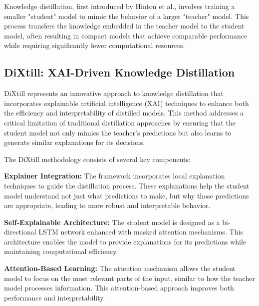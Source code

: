 Knowledge distillation, first introduced by Hinton et al., involves training a smaller "student" model to mimic the behavior of a larger "teacher" model. This process transfers the knowledge embedded in the teacher model to the student model, often resulting in compact models that achieve comparable performance while requiring significantly fewer computational resources.

\subsection{DiXtill: XAI-Driven Knowledge Distillation}

DiXtill represents an innovative approach to knowledge distillation that incorporates explainable artificial intelligence (XAI) techniques to enhance both the efficiency and interpretability of distilled models. This method addresses a critical limitation of traditional distillation approaches by ensuring that the student model not only mimics the teacher's predictions but also learns to generate similar explanations for its decisions.


The DiXtill methodology consists of several key components:

\textbf{Explainer Integration:} The framework incorporates local explanation techniques to guide the distillation process. These explanations help the student model understand not just what predictions to make, but why those predictions are appropriate, leading to more robust and interpretable behavior.

\textbf{Self-Explainable Architecture:} The student model is designed as a bi-directional LSTM network enhanced with masked attention mechanisms. This architecture enables the model to provide explanations for its predictions while maintaining computational efficiency.


\textbf{Attention-Based Learning:} The attention mechanism allows the student model to focus on the most relevant parts of the input, similar to how the teacher model processes information. This attention-based approach improves both performance and interpretability.

